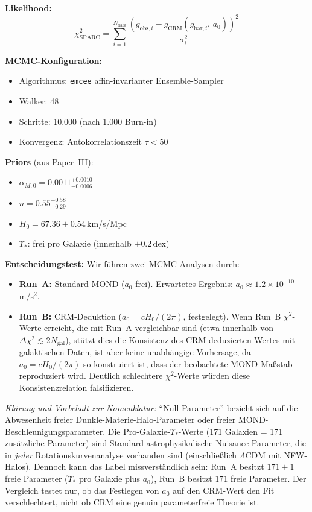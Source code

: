 \documentclass[aps,prd,twocolumn,superscriptaddress,nofootinbib]{revtex4-2}
\begin{document}
\textbf{Likelihood:}
\begin{equation}
\chi^2_{\mathrm{SPARC}} = \sum_{i=1}^{N_{\mathrm{data}}} \frac{\left(g_{\mathrm{obs},i} - g_{\mathrm{CRM}}(g_{\mathrm{bar},i},\, a_0)\right)^2}{\sigma_i^2}
\end{equation}

\textbf{MCMC-Konfiguration:}
\begin{itemize}
\item Algorithmus: \texttt{emcee} affin-invarianter Ensemble-Sampler \cite{ForemanMackey2013}
\item Walker: 48
\item Schritte: 10.000 (nach 1.000 Burn-in)
\item Konvergenz: Autokorrelationszeit $\tau < 50$
\end{itemize}

\textbf{Priors} (aus Paper~III):
\begin{itemize}
\item $\alpha_{M,0} = 0.0011^{+0.0010}_{-0.0006}$
\item $n = 0.55^{+0.58}_{-0.29}$
\item $H_0 = 67.36 \pm 0.54$\,km/s/Mpc
\item $\Upsilon_*$: frei pro Galaxie (innerhalb $\pm 0.2$\,dex)
\end{itemize}

\textbf{Entscheidungstest:} Wir f\"uhren zwei MCMC-Analysen durch:
\begin{itemize}
\item \textbf{Run~A:} Standard-MOND ($a_0$ frei). Erwartetes Ergebnis: $a_0 \approx 1.2 \times 10^{-10}$\,m/s$^2$.
\item \textbf{Run~B:} CRM-Deduktion ($a_0 = cH_0/(2\pi)$, festgelegt). Wenn Run~B $\chi^2$-Werte erreicht, die mit Run~A vergleichbar sind (etwa innerhalb von $\Delta\chi^2 \lesssim 2N_{\mathrm{gal}}$), st\"utzt dies die Konsistenz des CRM-deduzierten Wertes mit galaktischen Daten, ist aber keine unabh\"angige Vorhersage, da $a_0 = cH_0/(2\pi)$ so konstruiert ist, dass der beobachtete MOND-Ma\ss{}stab reproduziert wird. Deutlich schlechtere $\chi^2$-Werte w\"urden diese Konsistenzrelation falsifizieren.
\end{itemize}

\textit{Kl\"arung und Vorbehalt zur Nomenklatur:} ``Null-Parameter'' bezieht sich auf die Abwesenheit freier Dunkle-Materie-Halo-Parameter oder freier MOND-Beschleunigungsparameter. Die Pro-Galaxie-$\Upsilon_*$-Werte (171 Galaxien = 171 zus\"atzliche Parameter) sind Standard-astrophysikalische Nuisance-Parameter, die in \textit{jeder} Rotationskurvenanalyse vorhanden sind (einschlie\ss{}lich $\Lambda$CDM mit NFW-Halos). Dennoch kann das Label missverst\"andlich sein: Run~A besitzt $171+1$ freie Parameter ($\Upsilon_*$ pro Galaxie plus $a_0$), Run~B besitzt $171$ freie Parameter. Der Vergleich testet nur, ob das Festlegen von $a_0$ auf den CRM-Wert den Fit verschlechtert, nicht ob CRM eine genuin parameterfreie Theorie ist.
\end{document}
